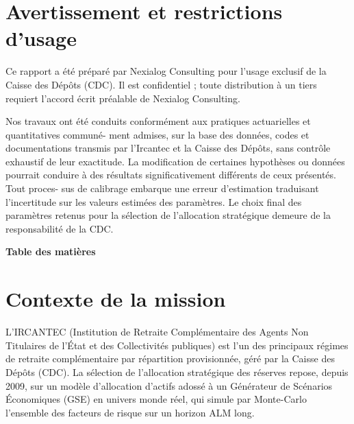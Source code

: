 \documentclass[11pt,a4paper]{article}
\begin{document}
\section*{Avertissement et restrictions d'usage}
Ce rapport a été préparé par Nexialog Consulting pour l'usage exclusif de la Caisse des Dépôts (CDC). Il est confidentiel ; toute distribution à un tiers requiert l'accord écrit préalable de Nexialog Consulting. 

Nos travaux ont été conduits conformément aux pratiques actuarielles et quantitatives communé-
ment admises, sur la base des données, codes et documentations transmis par l’Ircantec et la Caisse
des Dépôts, sans contrôle exhaustif de leur exactitude. La modification de certaines hypothèses ou
données pourrait conduire à des résultats significativement différents de ceux présentés. Tout proces-
sus de calibrage embarque une erreur d’estimation traduisant l’incertitude sur les valeurs estimées
des paramètres. Le choix final des paramètres retenus pour la sélection de l’allocation stratégique
demeure de la responsabilité de la CDC.
\clearpage

\begingroup
\hypersetup{hidelinks}
{\noindent\sffamily\Huge\bfseries\color{nxnavy}Table des matières\par}
\vspace{18mm}
\tableofcontents
{}
\endgroup
\newpage

\section{Contexte de la mission}

L'IRCANTEC (Institution de Retraite Complémentaire des Agents Non Titulaires de l'État et des Collectivités publiques) est l'un des principaux régimes de retraite complémentaire par répartition provisionnée, géré par la Caisse des Dépôts (CDC). La sélection de l'allocation stratégique des réserves repose, depuis 2009, sur un modèle d'allocation d'actifs adossé à un Générateur de Scénarios Économiques (GSE) en univers monde réel, qui simule par Monte-Carlo l'ensemble des facteurs de risque sur un horizon ALM long.
\end{document}
